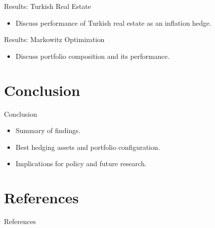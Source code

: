 \documentclass{beamer}
\begin{document}
\begin{frame}{Results: Turkish Real Estate}
\begin{itemize}
\tightlist
\item Discuss performance of Turkish real estate as an inflation hedge.
\end{itemize}
\end{frame}

\begin{frame}{Results: Markowitz Optimization}
\begin{itemize}
\tightlist
\item Discuss portfolio composition and its performance.
\end{itemize}
\end{frame}

\section{Conclusion}
\begin{frame}{Conclusion}
\begin{itemize}
\tightlist
\item Summary of findings.
\item Best hedging assets and portfolio configuration.
\item Implications for policy and future research.
\end{itemize}
\end{frame}

\section{References}
\begin{frame}[allowframebreaks]{References}
\end{frame}
\end{document}
